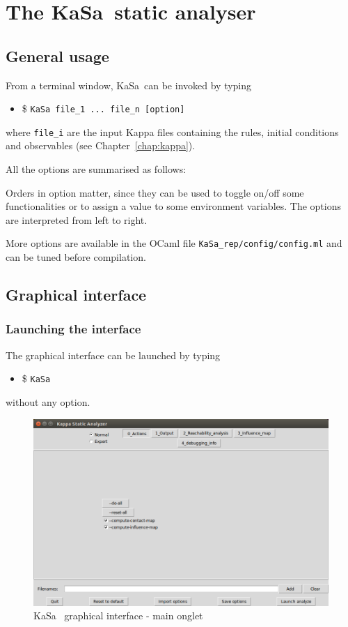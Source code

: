\documentclass[11pt]{book}
\def\KaSa{\textsf{KaSa}}
\def\ttt#1{\texttt{#1}}
\def\ITE#1{\begin{itemize}#1\end{itemize}}
\begin{document}
\chapter{The \KaSa~static analyser}

\section{General usage}

From a terminal window, \KaSa~can be invoked by typing 
\ITE{
\item[\$] \ttt{KaSa file\_1 ... file\_n  [option]}
}
where \ttt{file\_i} are the input Kappa files containing the rules, initial conditions and observables (see Chapter~\ref{chap:kappa}). 

All the options are summarised as follows: 


Orders in option matter, since they can be used to toggle on/off some functionalities or to assign a value to some environment variables. 
The options are interpreted from left to right. 

More options are available in the OCaml file \texttt{KaSa\_rep/config/config.ml} and can be tuned before compilation. 

\section{Graphical interface}

\subsection{Launching the interface}

The graphical interface can be launched by typing 
\ITE{\item[\$] \ttt{KaSa}}

without any option. 

\begin{figure}[htbp]
\centering
\includegraphics[width=12cm,natwidth=920pt,natheight=582pt]{img/kasa_0.png}
\caption{\KaSa~ graphical interface - main onglet}
\label{fig:kasa:0}
\end{figure}
\end{document}
